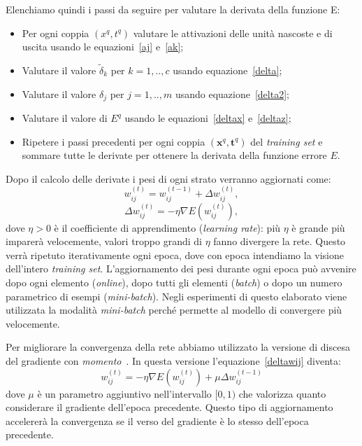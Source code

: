 \documentclass[11pt,a4paper,twoside,
openright]{book}
\begin{document}
Elenchiamo quindi i passi da seguire per valutare la derivata della funzione E:
\begin{itemize}
\item Per ogni coppia $(x^q,t^q)$ valutare le attivazioni delle unità nascoste e di uscita usando le equazioni~\eqref{aj} e~\eqref{ak};
\item Valutare il valore $\tilde{\delta}_k$ per $k=1,..,c$ usando equazione~\eqref{delta};
\item Valutare il valore $\delta_j$ per $j=1,..,m$ usando equazione~\eqref{delta2};
\item Valutare il valore di $E^q$ usando le equazioni~\eqref{deltax} e~\eqref{deltaz};
\item Ripetere i passi precedenti per ogni coppia $(\textbf{x}^q,\textbf{t}^q)$ del \textit{training set} e sommare tutte le derivate per ottenere la derivata della funzione errore $E$.
\end{itemize}

Dopo il calcolo delle derivate i pesi di ogni strato verranno aggiornati come:
\begin{equation}
w_{ij}^{(t)}=w_{ij}^{(t-1)} + \Delta w_{ij}^{(t)},
\label{update_w_ij}
\end{equation}
\begin{equation}
\Delta w_{ij}^{(t)} = -\eta \nabla E(w_{ij}^{(t)}),
\label{deltawij}
\end{equation}
dove $\eta>0$ è il coefficiente di apprendimento (\textit{learning rate}): più $\eta$ è grande più imparerà velocemente, valori troppo grandi di $\eta$ fanno divergere la rete.
Questo verrà ripetuto iterativamente ogni epoca, dove con epoca intendiamo la visione dell'intero \textit{training set}.
L'aggiornamento dei pesi durante ogni epoca può avvenire dopo ogni elemento (\textit{online}), dopo tutti gli elementi (\textit{batch}) o dopo un numero parametrico di esempi (\textit{mini-batch}).
Negli esperimenti di questo elaborato viene utilizzata la modalità \textit{mini-batch} perché permette al modello di convergere più velocemente.

Per migliorare la convergenza della rete abbiamo utilizzato la versione di discesa del gradiente con \textit{momento}~\cite{journals/nn/Qian99}.
In questa versione l'equazione~\eqref{deltawij} diventa:
\begin{equation}
w_{ij}^{(t)}=- \eta \nabla E(w_{ij}^{(t)}) + \mu \Delta w_{ij}^{(t-1)}
\label{momentum}
\end{equation}
dove $\mu$ è un parametro aggiuntivo nell'intervallo $[0,1)$ che valorizza quanto considerare il gradiente dell'epoca precedente. 
Questo tipo di aggiornamento accelererà la convergenza se il verso del gradiente è lo stesso dell'epoca precedente. 
\end{document}
